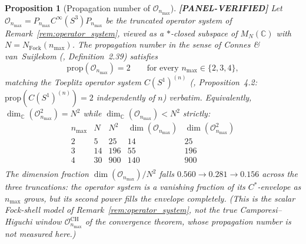 \documentclass[11pt]{article}
\newtheorem{proposition}{Proposition}
\begin{document}
\begin{proposition}[Propagation number of $\mathcal{O}_{n_{\max}}$]
\label{prop:propagation_number}
\textbf{[PANEL-VERIFIED]} Let $\mathcal{O}_{n_{\max}} = P_{n_{\max}} C^\infty(S^3) P_{n_{\max}}$
be the truncated operator system of
Remark~\ref{rem:operator_system}, viewed as a $*$-closed subspace of
$M_N(\mathbb{C})$ with $N = N_{\mathrm{Fock}}(n_{\max})$.  The
propagation number in the sense of Connes \& van~Suijlekom
(\cite{connes_vs2021}, Definition~2.39) satisfies
\begin{equation}
   \mathrm{prop}(\mathcal{O}_{n_{\max}}) = 2
   \qquad \text{for every } n_{\max} \in \{2, 3, 4\},
   \label{eq:prop_two}
\end{equation}
matching the Toeplitz operator system $C(S^1)^{(n)}$
(\cite{connes_vs2021}, Proposition~4.2: $\mathrm{prop}(C(S^1)^{(n)}) =
2$ independently of $n$) verbatim.  Equivalently,
$\dim_{\mathbb{C}}(\mathcal{O}_{n_{\max}}^2) = N^2$ while
$\dim_{\mathbb{C}}(\mathcal{O}_{n_{\max}}) < N^2$ strictly:
\[
\renewcommand{\arraystretch}{1.15}
\begin{array}{c|c|c|c|c}
n_{\max} & N & N^2 & \dim(\mathcal{O}_{n_{\max}}) &
   \dim(\mathcal{O}_{n_{\max}}^2) \\ \hline
2 & 5  & 25  & 14  & 25  \\
3 & 14 & 196 & 55  & 196 \\
4 & 30 & 900 & 140 & 900 \\
\end{array}
\]
The dimension fraction $\dim(\mathcal{O}_{n_{\max}}) / N^2$ falls
$0.560 \to 0.281 \to 0.156$ across the three truncations: the
operator system is a vanishing fraction of its $C^*$-envelope as
$n_{\max}$ grows, but its second power fills the envelope
completely.  (This is the scalar Fock-shell model of
Remark~\ref{rem:operator_system}, not the true Camporesi--Higuchi
window $\mathcal{O}^{\mathrm{CH}}_{n_{\max}}$ of the convergence
theorem, whose propagation number is not measured here.)
\end{proposition}
\end{document}
